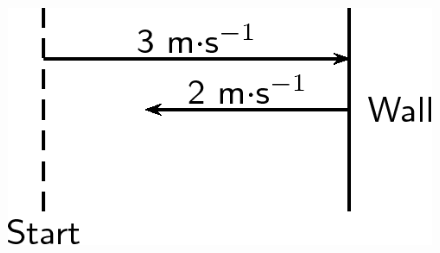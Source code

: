 {\begin{mdframed}[linewidth=4, leftmargin=40, rightmargin=40]
\begin{exercise}
\begin{enumerate}[noitemsep, label=\textbf{Step} \textbf{\arabic*}. ]
    \setcounter{subfigure}{0}


	\begin{figure}[H] %
    \begin{center}
    \label{m38816*id190944!!!underscore!!!media}\label{m38816*id190944!!!underscore!!!printimage}\includegraphics{col11305.imgs/m38816_PG11C1_055.png} %
        
      \vspace{2pt}
    \vspace{.1in}
    
    \end{center}

 \end{figure}   

    \addtocounter{footnote}{-0}
    

\end{enumerate}
\end{exercise}
\end{mdframed}}

